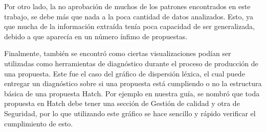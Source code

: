     Por otro lado, la no aprobación de muchos de los patrones encontrados en este trabajo, se debe más que nada a la poca cantidad de datos analizados. Esto, ya que mucha de la información extraída tenía poca capacidad de ser generalizada, debido a que aparecía en un número ínfimo de propuestas.
    
    Finalmente, también se encontró como ciertas visualizaciones podían ser utilizadas como herramientas de diagnóstico durante el proceso de producción de una propuesta. Este fue el caso del gráfico de dispersión léxica, el cual puede entregar  un diagnóstico sobre si una propuesta está cumpliendo o no la estructura básica de una propuesta Hatch. Por ejemplo en nuestra guía, se nombró que toda propuesta en Hatch debe tener una sección de Gestión de calidad y otra de Seguridad, por lo que utilizando este gráfico se hace sencillo y rápido verificar el cumplimiento de esto.

